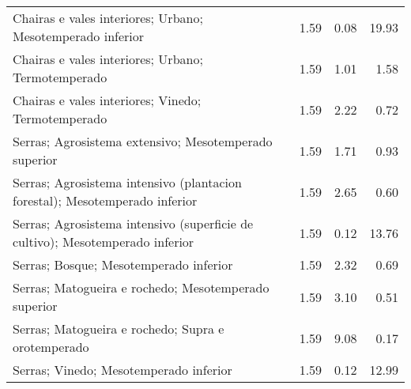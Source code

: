 \begin{table}[p]
\begin{tabular}{lrrr}
  Chairas e vales interiores; Urbano; Mesotemperado inferior & 1.59 & 0.08 & 19.93 \\ 
  Chairas e vales interiores; Urbano; Termotemperado & 1.59 & 1.01 & 1.58 \\ 
  Chairas e vales interiores; Vinedo; Termotemperado & 1.59 & 2.22 & 0.72 \\ 
  Serras; Agrosistema extensivo; Mesotemperado superior & 1.59 & 1.71 & 0.93 \\ 
  Serras; Agrosistema intensivo (plantacion forestal); Mesotemperado inferior & 1.59 & 2.65 & 0.60 \\ 
  Serras; Agrosistema intensivo (superficie de cultivo); Mesotemperado inferior & 1.59 & 0.12 & 13.76 \\ 
  Serras; Bosque; Mesotemperado inferior & 1.59 & 2.32 & 0.69 \\ 
  Serras; Matogueira e rochedo; Mesotemperado superior & 1.59 & 3.10 & 0.51 \\ 
  Serras; Matogueira e rochedo; Supra e orotemperado & 1.59 & 9.08 & 0.17 \\ 
  Serras; Vinedo; Mesotemperado inferior & 1.59 & 0.12 & 12.99 \\ 
   \hline
\end{tabular}
\end{table}
